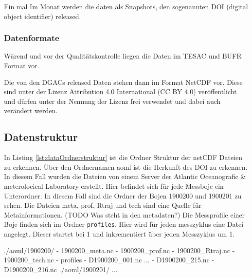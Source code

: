     Ein mal Im Monat werden die daten als Snapshots, den sogenannten DOI (digital object identifier) released. 
    
    \subsubsection{Datenformate}
    
    Wärend und vor der Qualitätskontrolle liegen die Daten im TESAC und BUFR Format vor. 
    
    Die von den DGACs released Daten stehen dann im Format NetCDF vor. Diese sind unter der Lizenz Attribution 4.0 International (CC BY 4.0) veröffentlicht und dürfen unter der Nennung der Lizenz frei verwendet und dabei auch verändert werden.
    
    \cite{ArgoDataDocumentation}
    
    
    \subsection{Datenstruktur}
    
    
In Listing \ref{lst:dataOrdnerstruktur} ist die Ordner Struktur der netCDF Dateien zu erkennen. Über den Ordnernamen aoml ist die Herkunft des DOI zu erkennen. In diesem Fall wurden die Dateien von einem Server der  Atlantic Oceanografic \& meterolocical Laboratory erstellt. Hier befindet sich für jede Messboje ein Unterordner. In diesem Fall sind die Ordner der Bojen 1900200 und 1900201 zu sehen. Die Dateien meta, prof, Rtraj und tech sind eine Quelle für Metainformationen. (TODO Was steht in den metadaten?) Die Messprofile einer Boje finden sich im Ordner \texttt{profiles}. Hier wird für jeden messzyklus eine Datei angelegt. Dieser startet bei 1 und inkrementiert über jeden Messzyklus um 1.
    
    \begin{python}[label={lst:dataOrdnerstruktur}, caption={test}]
./aoml/1900200/
- 1900200_meta.nc
- 1900200_prof.nc
- 1900200_Rtraj.nc
- 1900200_tech.nc
- profiles
    - D1900200_001.nc
    ...
    - D1900200_215.nc
    - D1900200_216.nc
./aoml/1900201/
...\end{python}

    
    
